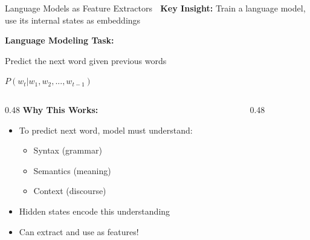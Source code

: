 \documentclass[aspectratio=169]{beamer}
\begin{document}
\begin{frame}[shrink=10]{Language Models as Feature Extractors 🧬}
\textbf{Key Insight:} Train a language model, use its internal states as embeddings

\vspace{1em}

\textbf{Language Modeling Task:}
\begin{center}
Predict the next word given previous words

\vspace{0.5em}
$P(w_t | w_1, w_2, ..., w_{t-1})$
\end{center}

\vspace{1em}

\begin{columns}[T]
\begin{column}{0.48\textwidth}
\textbf{Why This Works:}
\begin{itemize}\setlength{\itemsep}{0pt}
    \item To predict next word, model must understand:
    \begin{itemize}\setlength{\itemsep}{0pt}
        \item Syntax (grammar)
        \item Semantics (meaning)
        \item Context (discourse)
    \end{itemize}
    \item Hidden states encode this understanding
    \item Can extract and use as features!
\end{itemize}
\end{column}

\begin{column}{0.48\textwidth}
\begin{center}
\end{center}
\end{column}
\end{columns}
\end{frame}
\end{document}
